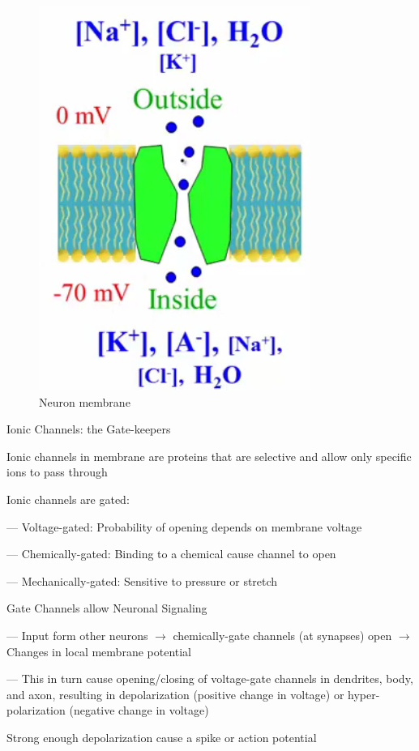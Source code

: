 \documentclass{book}
\begin{document}
\begin{figure}[h]
\centering
\includegraphics[width=0.7\linewidth]{./figures/ionchanel}
\caption{Neuron membrane}
\label{fig:ionchanel}
\end{figure}

Ionic Channels: the Gate-keepers

Ionic channels in membrane are proteins that are selective and allow only specific ions to pass through

Ionic channels are gated:

--- Voltage-gated: Probability of opening depends on membrane voltage

--- Chemically-gated: Binding to a chemical cause channel to open

--- Mechanically-gated: Sensitive to pressure or stretch 

Gate Channels allow Neuronal Signaling

--- Input form other neurons $\rightarrow$ chemically-gate channels (at synapses) open $\rightarrow$ Changes in local membrane potential

--- This in turn cause opening/closing of voltage-gate channels in dendrites, body, and axon, resulting in depolarization (positive change in voltage) or hyper-polarization (negative change in voltage)

Strong enough depolarization cause a spike or action potential
\end{document}
